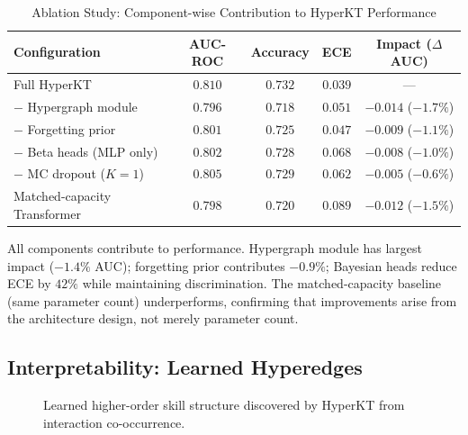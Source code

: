 \documentclass[preprint,12pt]{elsarticle}
\begin{document}
\begin{table}[H]\centering
\caption{Ablation Study: Component-wise Contribution to HyperKT Performance}\label{tab:ablation}
\small
\begin{tabularx}{\linewidth}{@{\extracolsep{\fill}}lcccc@{}}\toprule
\textbf{Configuration} & \textbf{AUC-ROC} & \textbf{Accuracy} & \textbf{ECE} & \textbf{Impact ($\Delta$AUC)}\\\midrule
Full HyperKT & $0.810$ & $0.732$ & $0.039$ & ---\\
\quad$-$ Hypergraph module & $0.796$ & $0.718$ & $0.051$ & $-0.014$ ($-1.7\%$)\\
\quad$-$ Forgetting prior & $0.801$ & $0.725$ & $0.047$ & $-0.009$ ($-1.1\%$)\\
\quad$-$ Beta heads (MLP only) & $0.802$ & $0.728$ & $0.068$ & $-0.008$ ($-1.0\%$)\\
\quad$-$ MC dropout ($K=1$) & $0.805$ & $0.729$ & $0.062$ & $-0.005$ ($-0.6\%$)\\
Matched-capacity Transformer & $0.798$ & $0.720$ & $0.089$ & $-0.012$ ($-1.5\%$)\\
\bottomrule\end{tabularx}
\end{table}

All components contribute to performance. Hypergraph module has largest impact ($-1.4\%$ AUC); forgetting prior contributes $-0.9\%$; Bayesian heads reduce ECE by $42\%$ while maintaining discrimination. The matched-capacity baseline (same parameter count) underperforms, confirming that improvements arise from the architecture design, not merely parameter count.

\subsection{Interpretability: Learned Hyperedges}

\begin{figure}[H]\centering
{}
\caption{Learned higher-order skill structure discovered by HyperKT from interaction co-occurrence.}\label{fig:hyperedges}
\end{figure}
\end{document}
